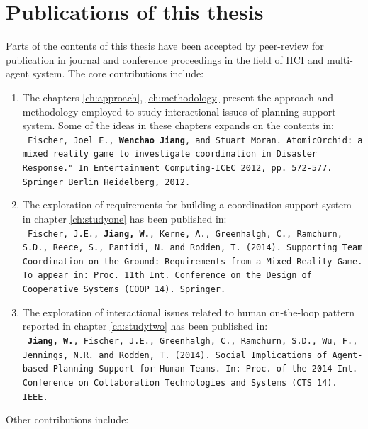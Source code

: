 \section{Publications of this thesis} 
Parts of the contents of this thesis have been accepted by peer-review for publication in journal and conference proceedings in the field of \ac{HCI} and multi-agent system. The core contributions include: \\


\begin{enumerate}
\item The chapters \ref{ch:approach}, \ref{ch:methodology}  present the approach and methodology employed to study interactional issues of planning support system. Some of the ideas in these chapters expands on the contents in:\\
\texttt{ \footnotesize Fischer, Joel E., \textbf{Wenchao Jiang}, and Stuart Moran. AtomicOrchid: a mixed reality game to investigate coordination in Disaster Response." In Entertainment Computing-ICEC 2012, pp. 572-577. Springer Berlin Heidelberg, 2012.}\\

\item The exploration of requirements for building a coordination support system in chapter \ref{ch:studyone}  has been published in:\\
\texttt{ \footnotesize Fischer, J.E., \textbf{Jiang, W.}, Kerne, A., Greenhalgh, C., Ramchurn, S.D., Reece, S., Pantidi, N. and Rodden, T. (2014). Supporting Team Coordination on the Ground: Requirements from a Mixed Reality Game. To appear in: Proc. 11th Int. Conference on the Design of Cooperative Systems (COOP 14). Springer.}\\


\item The exploration of interactional issues related to human on-the-loop pattern reported in chapter \ref{ch:studytwo} has been published in:\\
\texttt{ \footnotesize\textbf{Jiang, W.}, Fischer, J.E., Greenhalgh, C., Ramchurn, S.D., Wu, F., Jennings, N.R. and Rodden, T. (2014). Social Implications of Agent-based Planning Support for Human Teams.  In: Proc. of the 2014 Int. Conference on Collaboration Technologies and Systems (CTS 14). IEEE.}


\end{enumerate}

Other contributions include:

